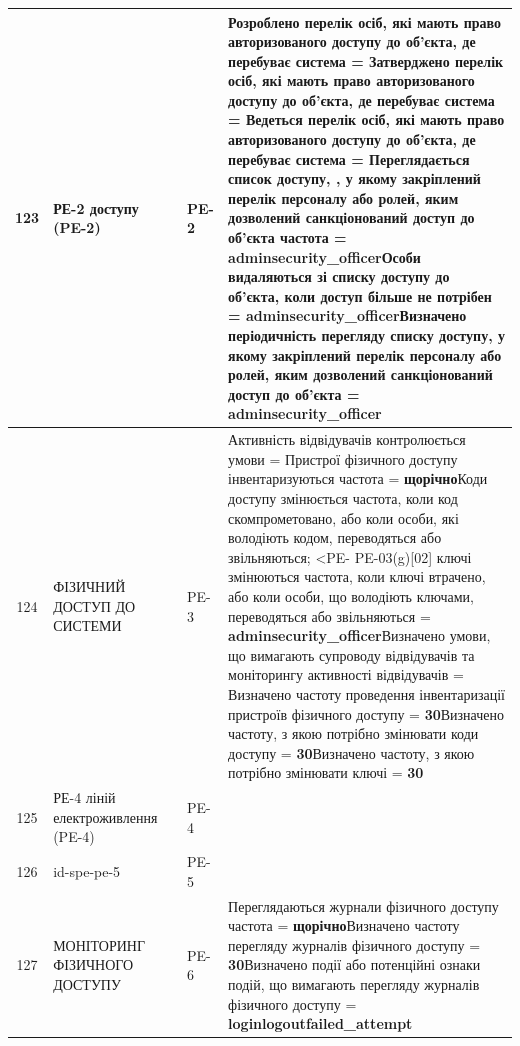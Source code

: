\documentclass[10pt]{article}
\begin{document}
\begin{longtable}{|c|>{\raggedright\arraybackslash}p{2.5cm}|>{\raggedright\arraybackslash}p{4.5cm}|>{\raggedright\arraybackslash}p{3cm}|>{\raggedright\arraybackslash}p{4.5cm}|}
123 & РЕ-2 доступу (PE-2) &  & PE-2 & Розроблено перелік осіб, які мають право авторизованого доступу до об'єкта, де перебуває система = \textbf{}\newline Затверджено перелік осіб, які мають право авторизованого доступу до об'єкта, де перебуває система = \textbf{}\newline Ведеться перелік осіб, які мають право авторизованого доступу до об'єкта, де перебуває система = \textbf{}\newline Переглядається список доступу, , у якому закріплений перелік персоналу або ролей, яким дозволений санкціонований доступ до об'єкта частота = \textbf{adminsecurity\_\allowbreak{}officer}\newline Особи видаляються зі списку доступу до об'єкта, коли доступ більше не потрібен = \textbf{adminsecurity\_\allowbreak{}officer}\newline Визначено періодичність перегляду списку доступу, у якому закріплений перелік персоналу або ролей, яким дозволений санкціонований доступ до об'єкта = \textbf{adminsecurity\_\allowbreak{}officer} \\ \hline
124 & ФІЗИЧНИЙ ДОСТУП ДО СИСТЕМИ &  & PE-3 & Активність відвідувачів контролюється умови = \textbf{}\newline Пристрої фізичного доступу інвентаризуються частота = \textbf{щорічно}\newline Коди доступу змінюється частота, коли код скомпрометовано, або коли особи, які володіють кодом, переводяться або звільняються; <PE- PE-03(g)[02] ключі змінюються частота, коли ключі втрачено, або коли особи, що володіють ключами, переводяться або звільняються = \textbf{adminsecurity\_\allowbreak{}officer}\newline Визначено умови, що вимагають супроводу відвідувачів та моніторингу активності відвідувачів = \textbf{}\newline Визначено частоту проведення інвентаризації пристроїв фізичного доступу = \textbf{30}\newline Визначено частоту, з якою потрібно змінювати коди доступу = \textbf{30}\newline Визначено частоту, з якою потрібно змінювати ключі = \textbf{30} \\ \hline
125 & РЕ-4 ліній електроживлення (PE-4) &  & PE-4 &  \\ \hline
126 & id-spe-pe-5 &  & PE-5 &  \\ \hline
127 & МОНІТОРИНГ ФІЗИЧНОГО ДОСТУПУ &  & PE-6 & Переглядаються журнали фізичного доступу частота = \textbf{щорічно}\newline Визначено частоту перегляду журналів фізичного доступу = \textbf{30}\newline Визначено події або потенційні ознаки подій, що вимагають перегляду журналів фізичного доступу = \textbf{loginlogoutfailed\_\allowbreak{}attempt} \\ \hline

\end{longtable}
\end{document}
